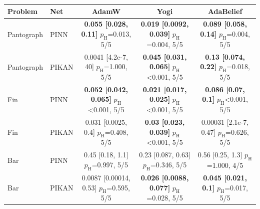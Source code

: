 \begin{tabular}{llccc}
\toprule
Problem & Net & AdamW & Yogi & AdaBelief\\
\midrule
Pantograph & PINN & \makecell{\textbf{0.055 [0.028, 0.11]}\\{\footnotesize $p_{\mathrm{H}}$=0.013, 5/5}} & \makecell{\textbf{0.019 [0.0092, 0.039]}\\{\footnotesize $p_{\mathrm{H}}$=0.004, 5/5}} & \makecell{\textbf{0.089 [0.058, 0.14]}\\{\footnotesize $p_{\mathrm{H}}$=0.004, 5/5}}\\
Pantograph & PIKAN & \makecell{0.0041 [4.2e-7, 40]\\{\footnotesize $p_{\mathrm{H}}$=1.000, 5/5}} & \makecell{\textbf{0.045 [0.031, 0.065]}\\{\footnotesize $p_{\mathrm{H}}$<0.001, 5/5}} & \makecell{\textbf{0.13 [0.074, 0.22]}\\{\footnotesize $p_{\mathrm{H}}$=0.018, 5/5}}\\
Fin & PINN & \makecell{\textbf{0.052 [0.042, 0.065]}\\{\footnotesize $p_{\mathrm{H}}$<0.001, 5/5}} & \makecell{\textbf{0.021 [0.017, 0.025]}\\{\footnotesize $p_{\mathrm{H}}$<0.001, 5/5}} & \makecell{\textbf{0.086 [0.07, 0.1]}\\{\footnotesize $p_{\mathrm{H}}$<0.001, 5/5}}\\
Fin & PIKAN & \makecell{0.031 [0.0025, 0.4]\\{\footnotesize $p_{\mathrm{H}}$=0.408, 5/5}} & \makecell{\textbf{0.03 [0.023, 0.039]}\\{\footnotesize $p_{\mathrm{H}}$<0.001, 5/5}} & \makecell{0.00031 [2.1e-7, 0.47]\\{\footnotesize $p_{\mathrm{H}}$=0.626, 5/5}}\\
Bar & PINN & \makecell{0.45 [0.18, 1.1]\\{\footnotesize $p_{\mathrm{H}}$=0.997, 5/5}} & \makecell{0.23 [0.087, 0.63]\\{\footnotesize $p_{\mathrm{H}}$=0.346, 5/5}} & \makecell{0.56 [0.25, 1.3]\\{\footnotesize $p_{\mathrm{H}}$=1.000, 4/5}}\\
Bar & PIKAN & \makecell{0.0087 [0.00014, 0.53]\\{\footnotesize $p_{\mathrm{H}}$=0.595, 5/5}} & \makecell{\textbf{0.026 [0.0088, 0.077]}\\{\footnotesize $p_{\mathrm{H}}$=0.028, 5/5}} & \makecell{\textbf{0.045 [0.021, 0.1]}\\{\footnotesize $p_{\mathrm{H}}$=0.017, 5/5}}\\

\end{tabular}
